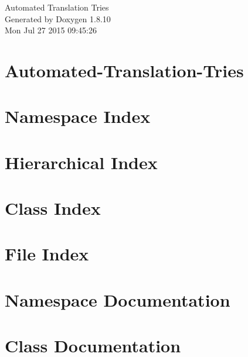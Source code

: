 \documentclass[twoside]{book}
\newcommand{\+}{\discretionary{\mbox{\scriptsize$\hookleftarrow$}}{}{}}
\newcommand{\clearemptydoublepage}{%
  \newpage{\pagestyle{empty}\cleardoublepage}%
}
\begin{document}
\hypersetup{pageanchor=false,
             bookmarks=true,
             bookmarksnumbered=true,
             pdfencoding=unicode
            }
\begin{titlepage}
\vspace*{7cm}
\begin{center}%
{\Large Automated Translation Tries }\\
\vspace*{1cm}
{\large Generated by Doxygen 1.8.10}\\
\vspace*{0.5cm}
{\small Mon Jul 27 2015 09:45:26}\\
\end{center}
\end{titlepage}
\clearemptydoublepage
\tableofcontents
\clearemptydoublepage
{}
\hypersetup{pageanchor=true}

\chapter{Automated-\/\+Translation-\/\+Tries}
\label{md__r_e_a_d_m_e}
\hypertarget{md__r_e_a_d_m_e}{}

\chapter{Namespace Index}

\chapter{Hierarchical Index}

\chapter{Class Index}

\chapter{File Index}

\chapter{Namespace Documentation}



\chapter{Class Documentation}










\end{document}
